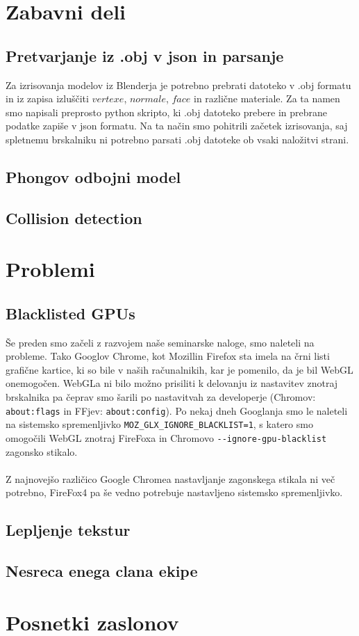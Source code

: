 \documentclass[10pt,a4paper]{article}
\begin{document}
\section{Zabavni deli}
\subsection{Pretvarjanje iz .obj v json in parsanje}
Za izrisovanja modelov iz Blenderja je potrebno prebrati datoteko v .obj formatu in iz zapisa
izluščiti $vertexe$, $normale$, $face$ in različne materiale. Za ta namen smo 
napisali preprosto python skripto, ki .obj datoteko prebere in prebrane podatke 
zapiše v json formatu. Na ta način smo pohitrili začetek izrisovanja, saj spletnemu
brskalniku ni potrebno parsati .obj datoteke ob vsaki naložitvi strani.
\subsection{Phongov odbojni model}
\subsection{Collision detection}
\pagebreak
\section{Problemi}
\subsection{Blacklisted GPUs}
Še preden smo začeli z razvojem naše seminarske naloge, smo naleteli na probleme.
Tako Googlov Chrome, kot Mozillin Firefox sta imela na črni listi grafične kartice,
ki so bile v naših računalnikih, kar je pomenilo, da je bil WebGL onemogočen. 
WebGLa ni bilo možno prisiliti k delovanju iz nastavitev znotraj brskalnika pa 
čeprav smo šarili po nastavitvah za developerje (Chromov: \verb|about:flags| in FFjev: \verb|about:config|).
Po nekaj dneh Googlanja smo le naleteli na sistemsko spremenljivko \verb|MOZ_GLX_IGNORE_BLACKLIST=1|,
s katero smo omogočili WebGL znotraj FireFoxa in Chromovo \verb|--ignore-gpu-blacklist| zagonsko stikalo.\\\\
Z najnovejšo različico Google Chromea nastavljanje zagonskega stikala ni več potrebno, 
FireFox4 pa še vedno potrebuje nastavljeno sistemsko spremenljivko.
\subsection{Lepljenje tekstur}
\subsection{Nesreca enega clana ekipe}
\pagebreak
\section{Posnetki zaslonov}
\end{document}
